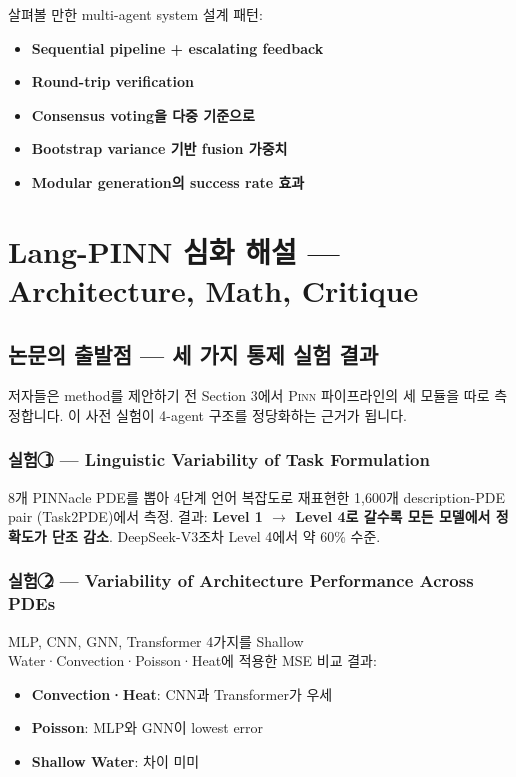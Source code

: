 \documentclass[11pt,a4paper,oneside]{report}
\newcommand{\pinn}{\textsc{Pinn}}
\begin{document}
살펴볼 만한 multi-agent system 설계 패턴:
\begin{itemize}
\item \textbf{Sequential pipeline + escalating feedback}
\item \textbf{Round-trip verification}
\item \textbf{Consensus voting을 다중 기준으로}
\item \textbf{Bootstrap variance 기반 fusion 가중치}
\item \textbf{Modular generation의 success rate 효과}
\end{itemize}

\chapter{Lang-PINN 심화 해설 --- Architecture, Math, Critique}

\section{논문의 출발점 --- 세 가지 통제 실험 결과}

저자들은 method를 제안하기 전 Section 3에서 \pinn{} 파이프라인의 세 모듈을 따로 측정합니다. 이 사전 실험이 4-agent 구조를 정당화하는 근거가 됩니다.

\subsection{실험 \textcircled{1} --- Linguistic Variability of Task Formulation}

8개 PINNacle PDE를 뽑아 4단계 언어 복잡도로 재표현한 1{,}600개 description-PDE pair (Task2PDE)에서 측정. 결과: \textbf{Level 1 $\rightarrow$ Level 4로 갈수록 모든 모델에서 정확도가 단조 감소}. DeepSeek-V3조차 Level 4에서 약 60\% 수준.

\subsection{실험 \textcircled{2} --- Variability of Architecture Performance Across PDEs}

MLP, CNN, GNN, Transformer 4가지를 Shallow Water·Convection·Poisson·Heat에 적용한 MSE 비교 결과:
\begin{itemize}
\item \textbf{Convection·Heat}: CNN과 Transformer가 우세
\item \textbf{Poisson}: MLP와 GNN이 lowest error
\item \textbf{Shallow Water}: 차이 미미
\end{itemize}
\end{document}
